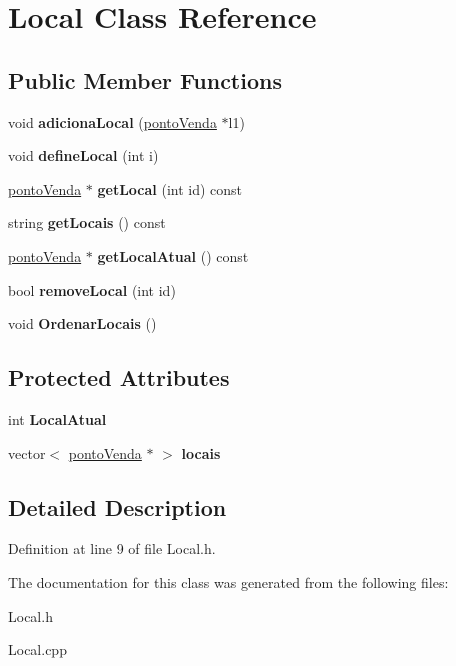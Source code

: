 \hypertarget{classLocal}{}\section{Local Class Reference}
\label{classLocal}
\subsection*{Public Member Functions}
\begin{DoxyCompactItemize}
\item 
\mbox{\label{classLocal_a036638c9db0360b139a29cbf01a128cd}} 
void {\bfseries adiciona\+Local} (\mbox{\hyperlink{classpontoVenda}{ponto\+Venda}} $\ast$l1)
\item 
\mbox{\label{classLocal_a0d964a2fc168f672e6c120298db679e9}} 
void {\bfseries define\+Local} (int i)
\item 
\mbox{\label{classLocal_abd7be8840f2dc385c73b9d0c4020a864}} 
\mbox{\hyperlink{classpontoVenda}{ponto\+Venda}} $\ast$ {\bfseries get\+Local} (int id) const
\item 
\mbox{\label{classLocal_ae938b675636e130b596efb936fd31038}} 
string {\bfseries get\+Locais} () const
\item 
\mbox{\label{classLocal_a7f5bacb1eb54e1fd1cc30f71ccde9140}} 
\mbox{\hyperlink{classpontoVenda}{ponto\+Venda}} $\ast$ {\bfseries get\+Local\+Atual} () const
\item 
\mbox{\label{classLocal_a3f042ea4e60a7884fd3b8c823ed74952}} 
bool {\bfseries remove\+Local} (int id)
\item 
\mbox{\label{classLocal_a5c1c9c4b341f7e12db68019cbf86cb29}} 
void {\bfseries Ordenar\+Locais} ()
\end{DoxyCompactItemize}
\subsection*{Protected Attributes}
\begin{DoxyCompactItemize}
\item 
\mbox{\label{classLocal_a3a388222c6194bb54b7856fbd829768c}} 
int {\bfseries Local\+Atual}
\item 
\mbox{\label{classLocal_ac87190d3c6fd2e17c41972940d81c0db}} 
vector$<$ \mbox{\hyperlink{classpontoVenda}{ponto\+Venda}} $\ast$ $>$ {\bfseries locais}
\end{DoxyCompactItemize}


\subsection{Detailed Description}


Definition at line 9 of file Local.\+h.



The documentation for this class was generated from the following files\+:\begin{DoxyCompactItemize}
\item 
Local.\+h\item 
Local.\+cpp\end{DoxyCompactItemize}
